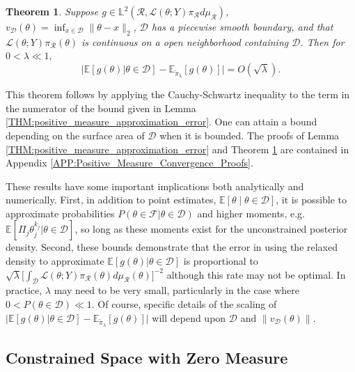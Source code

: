\documentclass[10pt,fleqn]{article} \pdfoutput=1
\newtheorem{theorem}{Theorem} \newtheorem{lemma}{Lemma}
\newcommand{\bb}[1]{\mathbb{#1}} \newcommand{\mc}[1]{\mathcal{#1}}
\DeclareMathOperator{\1}{\mathbbm{1}} \DeclareMathOperator{\bigO}{\mc O}
\begin{document}
\begin{theorem} \label{THM:Positive_measure_convergence_rate} Suppose $g
\in  \mathbb{L}^2(\mathcal{R},
\mathcal{L}(\theta;Y)\pi_\mathcal{R}d\mu_\mathcal{R})$,
$v_{\mc D}(\theta)= \inf_{x\in\mathcal{D}} \|\theta-x\|_2$, $\mathcal{D}$ has a piecewise smooth boundary, and that
$\mathcal{L}(\theta;Y)\pi_\mathcal{R}(\theta)$ is continuous on a
open neighborhood containing $\mathcal{D}$.  Then for $0<\lambda
\ll 1,$ $$ \bigg|\bb E[g(\theta) |\theta\in\mathcal{D}] -
\bb E_{\tilde{\pi}_\lambda}[g(\theta)]   \bigg| = O(\sqrt{\lambda}).  $$
\end{theorem} This theorem follows by applying the Cauchy-Schwartz
inequality to the term in the numerator of the bound given in Lemma
\ref{THM:positive_measure_approximation_error}.  One can attain a bound
depending on the surface area of $\mathcal{D}$ when it is bounded. The proofs of
Lemma \ref{THM:positive_measure_approximation_error} and Theorem
\ref{THM:Positive_measure_convergence_rate} are contained in Appendix
\ref{APP:Positive_Measure_Convergence_Proofs}.

These results have some important implications both analytically and
numerically.  First, in addition to point estimates,
$\bb E[\theta \mid \theta\in\mathcal{D}]$, it is possible to approximate
probabilities $P(\theta \in \mathcal{F}|\theta \in \mathcal{D})$ and higher
moments, e.g. $\bb E[\Pi_j \theta_j^{k_j} |\theta\in\mathcal{D}]$, so long as
these moments exist for the unconstrained posterior density. Second, these bounds demonstrate that the error in using the relaxed
density to approximate $\bb E[g(\theta)|\theta\in\mathcal{D}]$ is proportional
to $\sqrt{\lambda} [\int_\mathcal{D}\mathcal{L}(\theta; Y)
\pi_\mathcal{R}(\theta)d\mu_\mathcal{R}(\theta)\big]^{-2}$ although this
rate may not be optimal.  In practice, $\lambda$ may need to be very small,
particularly in the case where $0<P(\theta\in\mathcal{D})\ll 1.$ Of course,
specific details of the scaling of $\bigg|\bb E[g(\theta)
|\theta\in\mathcal{D}] - \bb E_{\tilde{\pi}_\lambda}[g(\theta)]   \bigg|$ will
depend upon $\mathcal{D}$ and $\|v_{\mc D}(\theta)\|$.

\subsection{Constrained Space with Zero Measure}
\label{SEC:Zero_measure_theory}
\end{document}
